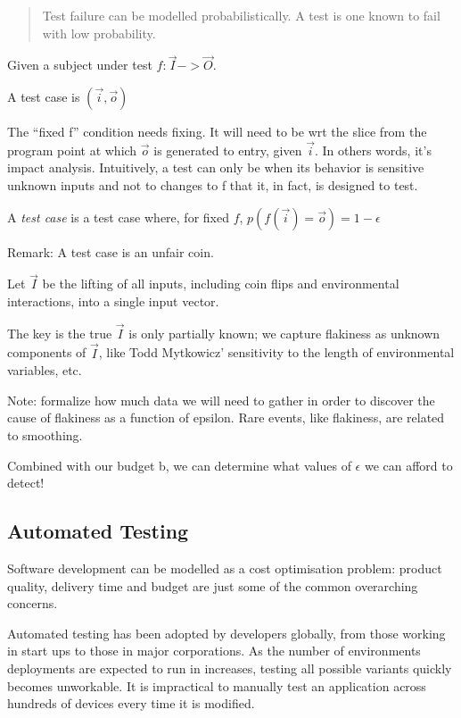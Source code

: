 \begin{quote}
	Test failure can be modelled probabilistically. A \flaky{} test is one known to fail with low probability.
\end{quote}

\begin{defn}\label{def:flakytest}
	Given a subject under test $f: \vec{I} -> \vec{O}$.

	A test case is $(\vec{i},\vec{o})$

	The “fixed f” condition needs fixing. It will need to be wrt the slice from the program point at which $\vec{o}$ is generated to entry, given $\vec{i}$. In others words, it’s impact analysis. Intuitively, a test can only be \flaky{} when its behavior is sensitive unknown inputs and not to changes to f that it, in fact, is designed to test.

	A \emph{\flaky{} test case} is a test case where, for fixed $f$,
	$p(f(\vec{i}) = \vec{o}) = 1 - \epsilon$


	Remark: A \flaky{} test case is an unfair coin.

	Let $\vec{I}$ be the lifting of all inputs, including coin flips and environmental interactions, into a single input vector.

	The key is the true $\vec{I}$ is only partially known;  we capture flakiness as unknown components of $\vec{I}$, like Todd Mytkowicz’ sensitivity to the length of environmental variables, etc.

	Note: formalize how much data we will need to gather in order to discover the cause of flakiness as a function of epsilon. Rare events, like flakiness, are related to smoothing.

	Combined with our budget b, we can determine what values of $\epsilon$ we can afford to detect!
\end{defn}

\subsection{Automated Testing}
\label{sec:sec:automated_testing}

Software development can be modelled as a cost optimisation problem: product quality, delivery time and budget are just some of the common overarching concerns.

Automated testing has been adopted by developers globally, from those working in start ups to those in major corporations. As the number of environments deployments are expected to run in increases, testing all possible variants quickly becomes unworkable. It is impractical to manually test an application across hundreds of devices every time it is modified.

